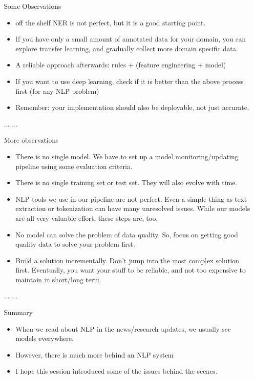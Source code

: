 \documentclass{beamer}
\begin{document}
\begin{frame}{Some Observations}
    \begin{itemize}
        \item off the shelf NER is not perfect, but it is a good starting point.
 \item If you have only a small amount of annotated data for your domain, you can explore transfer learning, and gradually collect more domain specific data. 
\item A reliable approach afterwards: rules + (feature engineering + model) 
\item If you want to use deep learning, check if it is better than the above process first (for any NLP problem)
\item Remember: your implementation should also be deployable, not just accurate. 
    \end{itemize}
    ... ... 
\end{frame}

\begin{frame}{More observations}
    \begin{itemize}
        \item There is no single model. We have to set up a model monitoring/updating pipeline using some evaluation criteria. 
\item There is no single training set or test set. They will also evolve with time. \pause
\item  NLP tools we use in our pipeline are not perfect. Even a simple thing as text extraction or tokenization can have many unresolved issues. While our models are all very valuable effort, these steps are, too. \pause
\item  No model can solve the problem of data quality. So, focus on getting good quality data to solve your problem first. \pause
\item Build a solution incrementally. Don't jump into the most complex solution first. Eventually, you want your stuff to be reliable, and not too expensive to maintain in short/long term. 

    \end{itemize}
    ... ... 
\end{frame}

\begin{frame}{Summary}
    \begin{itemize} 
    \item When we read about NLP in the news/research updates, we usually see models everywhere.
    \item However, there is much more behind an NLP system
    \item I hope this session introduced some of the issues behind the scenes. 
    \end{itemize}
\end{frame}
\end{document}
